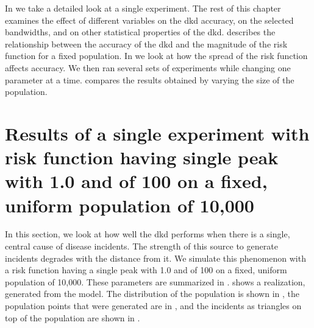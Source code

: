 In  we take a detailed look at a single experiment.
The rest of this chapter examines the effect of different variables on the \gls{dkd} accuracy, on the selected bandwidths, and on other statistical properties of the \gls{dkd}.
 describes the relationship between the accuracy of the \gls{dkd} and the magnitude of the risk function for a fixed population.
In  we look at how the spread of the risk function affects accuracy.
We then ran several sets of experiments while changing one parameter at a time.
 compares the results obtained by varying the size of the population.

\section[Results of single-peak risk on uniform population]
    {Results of a single experiment with risk function having single peak with  1.0 and  of 100 on a fixed, uniform population of 10,000}
\label{sec:results:unif_100_1.0_1h}


In this section, we look at how well the \gls{dkd} performs when there is a single, central cause of disease incidents.
The strength of this source to generate incidents degrades with the distance from it.
We simulate this phenomenon with a risk function having a single peak with  1.0 and  of 100 on a fixed, uniform population of 10,000.
These parameters are summarized in .
 shows a realization, generated from the model.
The distribution of the population is shown in ,
the population points that were generated are in ,
and the incidents as triangles on top of the population are shown in .

